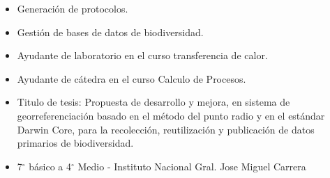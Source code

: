 \documentclass[10pt,letter,ragged2e]{altacv}
\begin{document}
\divider

\begin{itemize}
\item Generación de protocolos.
\item Gestión de bases de datos de biodiversidad.
\end{itemize}

\divider


\begin{itemize}
\item{Ayudante de laboratorio en el curso transferencia de calor.}
\item{Ayudante de cátedra en el curso Calculo de Procesos. }
\end{itemize}

\divider



\begin{itemize}
\item Titulo de tesis: Propuesta de desarrollo y mejora, en sistema de georreferenciación basado en el método del punto radio y en el estándar Darwin Core, para la recolección, reutilización y publicación de datos primarios de biodiversidad.
\end{itemize}

\divider

\begin{itemize}
\item 7$^\circ$ básico a 4$^\circ$ Medio - Instituto Nacional Gral. Jose Miguel Carrera
\end{itemize}
\end{document}
